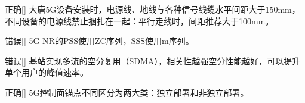 \begin{choice}{\;正确\;}[]
    大唐5G设备安装时，电源线、地线与各种信号线缆水平间距大于150mm，不同设备的电源线禁止捆扎在一起：平行走线时，间距推荐大于100mm。

\end{choice}

\begin{choice}{\;错误\;}[]
    5G NR的PSS使用ZC序列，SSS使用m序列。

\end{choice}

\begin{choice}{\;错误\;}[]
    基站实现多流的空分复用（SDMA），相关性越强空分性能越好，可以提升单个用户的峰值速率。
\end{choice}

\begin{choice}{\;正确\;}[]
    5G控制面锚点不同区分为两大类：独立部署和非独立部署。

\end{choice}




